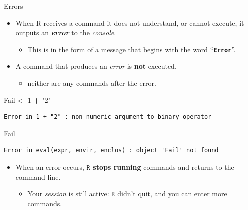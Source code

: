 \documentclass[
  11pt,
  ignorenonframetext,
]{beamer}
\newenvironment{Shaded}{\begin{snugshade}}{\end{snugshade}}
\newcommand{\DecValTok}[1]{\textcolor[rgb]{0.00,0.00,0.81}{#1}}
\newcommand{\ErrorTok}[1]{\textcolor[rgb]{0.64,0.00,0.00}{\textbf{#1}}}
\newcommand{\NormalTok}[1]{#1}
\newcommand{\OtherTok}[1]{\textcolor[rgb]{0.56,0.35,0.01}{#1}}
\newcommand{\SpecialCharTok}[1]{\textcolor[rgb]{0.81,0.36,0.00}{\textbf{#1}}}
\newcommand{\StringTok}[1]{\textcolor[rgb]{0.31,0.60,0.02}{#1}}
\providecommand{\tightlist}{%
  \setlength{\itemsep}{0pt}\setlength{\parskip}{0pt}}
\begin{document}
\begin{frame}[fragile]{Errors}
\protect\hypertarget{errors}{}
\begin{itemize}
\tightlist
\item
  When R receives a command it does not understand, or cannot execute,
  it outputs an \textbf{\emph{error}} to the \emph{console}.

  \begin{itemize}
  \tightlist
  \item
    This is in the form of a message that begins with the word
    ``\ErrorTok{\texttt{Error}}''.
  \end{itemize}
\item
  A command that produces an \emph{error} is \textbf{not} executed.

  \begin{itemize}
  \tightlist
  \item
    neither are any commands after the error.
  \end{itemize}
\end{itemize}

\begin{Shaded}
\begin{Highlighting}[]
\NormalTok{Fail }\OtherTok{\textless{}{-}} \DecValTok{1} \SpecialCharTok{+} \StringTok{"2"}
\end{Highlighting}
\end{Shaded}

\begin{verbatim}
Error in 1 + "2" : non-numeric argument to binary operator
\end{verbatim}

\begin{Shaded}
\begin{Highlighting}[]
\NormalTok{Fail}
\end{Highlighting}
\end{Shaded}

\begin{verbatim}
Error in eval(expr, envir, enclos) : object 'Fail' not found
\end{verbatim}

\begin{itemize}
\tightlist
\item
  When an error occurs, \textbf{\(\texttt{R}\) stops running} commands
  and returns to the command-line.

  \begin{itemize}
  \tightlist
  \item
    Your \emph{session} is still active: \(\texttt{R}\) didn't quit, and
    you can enter more commands.
  \end{itemize}
\end{itemize}
\end{frame}
\end{document}
